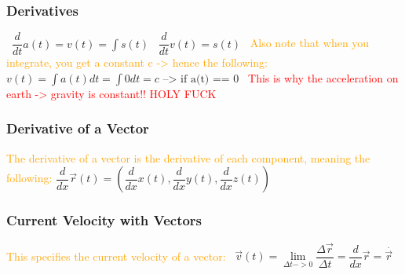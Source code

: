 \documentclass[main.tex,fontsize=8pt,paper=a4,paper=portrait,DIV=calc,]{scrartcl}
\begin{document}
\begin{multicols*}{2}
\subsubsection{Derivatives}
\, \newline
\large \(\dfrac{d}{dt}a(t) = v(t) = \int{s(t)} \)\newline
\, \newline
\large \(\dfrac{d}{dt}v(t) = s(t)\)\newline
\, \newline
\normalsize \textcolor{orange}{Also note that when you integrate, you get a constant c -> hence the following:}\newline
\, \newline
\large \( v(t) = \int{a(t) dt} = \int{0 dt} = c \text{ --> if a(t) == 0}\) \newline
\, \newline
\normalsize \textcolor{red}{This is why the acceleration on earth -> gravity is constant!! HOLY FUCK}

\subsubsection{Derivative of a Vector}
\textcolor{orange}{The derivative of a vector is the derivative of each component, meaning the following:}\newline
\large \(\dfrac{d}{dx} \vec{r}(t) = (\dfrac{d}{dx} x(t), \dfrac{d}{dx} y(t), \dfrac{d}{dx} z(t) ) \)\newline
\, \newline \normalsize

\subsubsection{Current Velocity with Vectors}
\textcolor{orange}{This specifies the current velocity of a vector:}\newline
\, \newline
\large \( \vec{v}(t) = \underset{\Delta t -> 0}{\lim} \dfrac{\Delta \vec{r}}{\Delta t} = \dfrac{d}{dx} \vec{r} = \overset{.}{\vec{r}} \) \newline 
\, \newline \normalsize


\end{multicols*}
\end{document}
